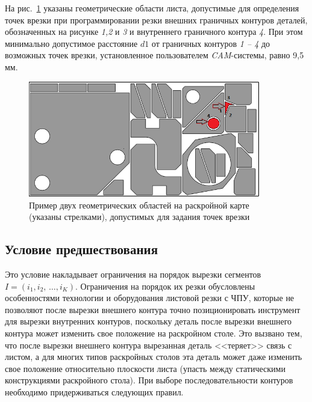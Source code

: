 \documentclass[11pt,twoside,openany]{report}
\begin{document}
На рис.~\ref{pierce-area}
указаны геометрические области листа,
допустимые для определения точек врезки при программировании резки
внешних граничных контуров деталей,
обозначенных на рисунке
\textit{1,2} и \textit{3}
и внутреннего граничного контура
\textit{4}.
При этом минимально допустимое расстояние $d1$
от граничных контуров
\textit{1 -- 4} до возможных точек врезки,
установленное пользователем
\textit{CAM}-системы, равно 9,5 мм.

\begin{figure}[h]
  \begin{center}
  \includegraphics[width=0.9\textwidth]{pierce-area.png}
  \caption{Пример двух геометрических областей на раскройной карте (указаны стрелками),
допустимых для задания точек врезки }
  \label{pierce-area}
  \end{center}
\end{figure}

{\raggedright\subsection{
  Условие предшествования
}}

Это условие накладывает ограничения на порядок вырезки сегментов
$ I = (i_1, i_2, \,\dots, i_K)$.
Ограничения на порядок их резки обусловлены особенностями
технологии и оборудования листовой резки с ЧПУ,
которые не позволяют после вырезки внешнего контура точно
позиционировать инструмент для вырезки внутренних контуров,
поскольку деталь после вырезки внешнего контура может
изменить свое положение на раскройном столе.
Это вызвано тем, что после вырезки внешнего контура
вырезанная деталь <<теряет>> связь с листом,
а для многих типов раскройных столов эта деталь
может даже изменить свое положение относительно плоскости листа
(упасть между статическими конструкциями раскройного стола).
При выборе последовательности контуров
необходимо придерживаться следующих правил.
\end{document}

